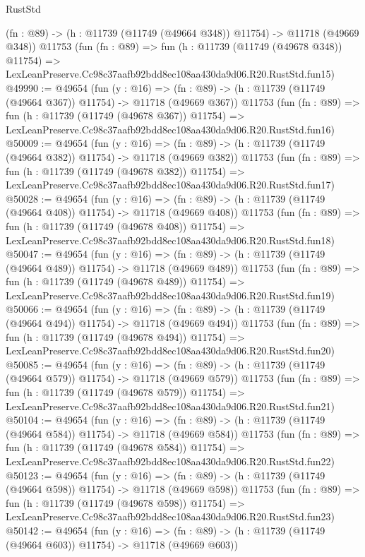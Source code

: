 \begin{lexlean}{RustStd}
\begin{coremodule}
    (fn : @89) -> (h : @11739 (@11749 (@49664 @348)) @11754) -> @11718 (@49669 @348))
    @11753
    (fun (fn : @89) =>
    fun (h : @11739 (@11749 (@49678 @348)) @11754) =>
    LexLeanPreserve.Cc98c37aafb92bdd8ec108aa430da9d06.R20.RustStd.fun15)
@49990 := @49654
    (fun (y : @16) =>
    (fn : @89) -> (h : @11739 (@11749 (@49664 @367)) @11754) -> @11718 (@49669 @367))
    @11753
    (fun (fn : @89) =>
    fun (h : @11739 (@11749 (@49678 @367)) @11754) =>
    LexLeanPreserve.Cc98c37aafb92bdd8ec108aa430da9d06.R20.RustStd.fun16)
@50009 := @49654
    (fun (y : @16) =>
    (fn : @89) -> (h : @11739 (@11749 (@49664 @382)) @11754) -> @11718 (@49669 @382))
    @11753
    (fun (fn : @89) =>
    fun (h : @11739 (@11749 (@49678 @382)) @11754) =>
    LexLeanPreserve.Cc98c37aafb92bdd8ec108aa430da9d06.R20.RustStd.fun17)
@50028 := @49654
    (fun (y : @16) =>
    (fn : @89) -> (h : @11739 (@11749 (@49664 @408)) @11754) -> @11718 (@49669 @408))
    @11753
    (fun (fn : @89) =>
    fun (h : @11739 (@11749 (@49678 @408)) @11754) =>
    LexLeanPreserve.Cc98c37aafb92bdd8ec108aa430da9d06.R20.RustStd.fun18)
@50047 := @49654
    (fun (y : @16) =>
    (fn : @89) -> (h : @11739 (@11749 (@49664 @489)) @11754) -> @11718 (@49669 @489))
    @11753
    (fun (fn : @89) =>
    fun (h : @11739 (@11749 (@49678 @489)) @11754) =>
    LexLeanPreserve.Cc98c37aafb92bdd8ec108aa430da9d06.R20.RustStd.fun19)
@50066 := @49654
    (fun (y : @16) =>
    (fn : @89) -> (h : @11739 (@11749 (@49664 @494)) @11754) -> @11718 (@49669 @494))
    @11753
    (fun (fn : @89) =>
    fun (h : @11739 (@11749 (@49678 @494)) @11754) =>
    LexLeanPreserve.Cc98c37aafb92bdd8ec108aa430da9d06.R20.RustStd.fun20)
@50085 := @49654
    (fun (y : @16) =>
    (fn : @89) -> (h : @11739 (@11749 (@49664 @579)) @11754) -> @11718 (@49669 @579))
    @11753
    (fun (fn : @89) =>
    fun (h : @11739 (@11749 (@49678 @579)) @11754) =>
    LexLeanPreserve.Cc98c37aafb92bdd8ec108aa430da9d06.R20.RustStd.fun21)
@50104 := @49654
    (fun (y : @16) =>
    (fn : @89) -> (h : @11739 (@11749 (@49664 @584)) @11754) -> @11718 (@49669 @584))
    @11753
    (fun (fn : @89) =>
    fun (h : @11739 (@11749 (@49678 @584)) @11754) =>
    LexLeanPreserve.Cc98c37aafb92bdd8ec108aa430da9d06.R20.RustStd.fun22)
@50123 := @49654
    (fun (y : @16) =>
    (fn : @89) -> (h : @11739 (@11749 (@49664 @598)) @11754) -> @11718 (@49669 @598))
    @11753
    (fun (fn : @89) =>
    fun (h : @11739 (@11749 (@49678 @598)) @11754) =>
    LexLeanPreserve.Cc98c37aafb92bdd8ec108aa430da9d06.R20.RustStd.fun23)
@50142 := @49654
    (fun (y : @16) =>
    (fn : @89) -> (h : @11739 (@11749 (@49664 @603)) @11754) -> @11718 (@49669 @603))

\end{coremodule}
\end{lexlean}

